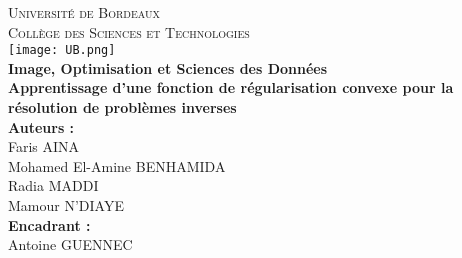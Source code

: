 \documentclass[a4paper, 12pt]{report} %
\begin{document}
 

\everymath{\displaystyle}


\begin{titlepage}
\begin{center} %

\textsc{\huge Université de Bordeaux} \\[0.5cm]

\textsc{\Large Collège des Sciences et Technologies} \\[0.5cm]

\texttt{[image: UB.png]} \\[0.5cm]

\textbf{\LARGE Image, Optimisation et Sciences des Données} \\[1 cm]

\textbf{\Huge Apprentissage d'une fonction de régularisation convexe
pour la résolution de problèmes inverses} \\[1cm]

\Large\textbf{Auteurs :} \\[0.5cm]
Faris \textsc{AINA} \\[0.3cm]
Mohamed El-Amine \textsc{BENHAMIDA} \\[0.3cm]
Radia \textsc{MADDI} \\[0.3cm]
Mamour \textsc{N'DIAYE} \\[2cm]

\Large\textbf{Encadrant :} \\[0.5cm]
Antoine \textsc{GUENNEC} \\[0.5cm]

\end{center}
\end{titlepage}

\end{document}
